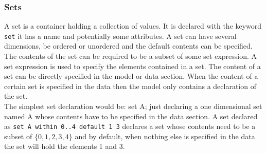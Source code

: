 \subsubsection{Sets}
A set is a container holding a collection of values. It is declared with the keyword \verb=set= it has a name and potentially some attributes. A set can have several dimensions, be ordered or unordered and the default contents can be specified. The contents of the set can be required to be a subset of some set expression. A set expression is used to specify the elements contained in a set. The content of a set can be directly specified in the model or data section. When the content of a certain set is specified in the data then the model only contains a declaration of the set.\\
The simplest set declaration would be: set A; just declaring a one dimensional set named A whose contents have to be specified in the data section. 
A set declared as \verb&set A within 0..4 default 1 3& declares a set whose contents need to be a subset of $\lbrace 0,1,2,3,4\rbrace$ and by default, when nothing else is specified in the data the set will hold the elements 1 and 3.
